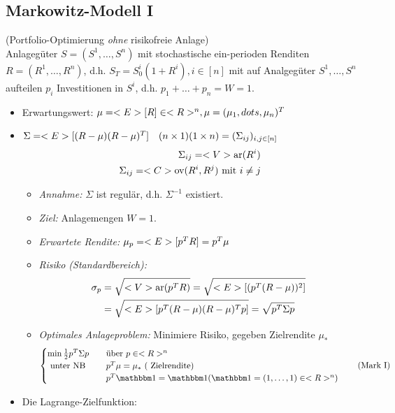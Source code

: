 \subsection*{Markowitz-Modell I}
(Portfolio-Optimierung \emph{ohne} risikofreie Anlage)\\
Anlagegüter $S = (S^1, \dots, S^n)$ mit stochastische ein-perioden Renditen $R = (R^1, \dots, R^n)$, d.h. $S_T = S_0^i(1+R^i), i \in [n]$ mit auf Analgegüter $S^1, \dots, S^n$ aufteilen $p_i$ Investitionen in $S^i$, d.h. $p_1 + \dots + p_n = W = 1$.
\begin{itemize}
	\item Erwartungswert: $\mu = <E>[R] \in <R>^n, \mu = (\mu_1, dots, \mu_n)^T$
	\item $\Sigma = <E>[(R-\mu)(R-\mu)^T]\quad (n\times 1)(1\times n) = (\Sigma_{ij})_{i,j \in [n]}$
	\begin{align*}
		\Sigma_{ij} = <V>\text{ar}(R^i)\\
		\Sigma_{ij} = <C>\text{ov}(R^{i},R^j) \text{ mit } i \neq j
	\end{align*}
	\begin{itemize}
		\item \emph{Annahme:} $\Sigma$ ist regulär, d.h. $\Sigma^{-1}$ existiert.
		\item \emph{Ziel:} Anlagemengen $W=1$. 
		\item \emph{Erwartete Rendite:} $\mu_p = <E>[p^T R] = p^T \mu$
		\item \emph{Risiko (Standardbereich):}
		\begin{align*}
			\sigma_p &= \sqrt{<V>\text{ar}(p^T R)} = \sqrt{<E>[(p^T (R-\mu))^2]}\\
			&=\sqrt{<E>[p^T (R-\mu)(R-\mu)^Tp]} = \sqrt{p^T \Sigma p}
		\end{align*}
		\item \emph{Optimales Anlageproblem:} Minimiere Risiko, gegeben Zielrendite $\mu_{\ast}$
		\begin{align}
			\begin{cases}
				\min \half p^T \Sigma p & \quad\text{über } p \in \R^n\\
				\text{ unter NB} &\quad p^T \mu = \mu_{\ast} \text{ ( Zielrendite)}\\
				&\quad p^T \indi = \indi (\indi = (1, \dots, 1) \in \R^n)
			\end{cases} \label{eq_Markow_one}\tag{Mark I}
		\end{align}
	\end{itemize}
	\item Die Lagrange-Zielfunktion: 
\begin{align*}

\end{align*}
\end{itemize}
